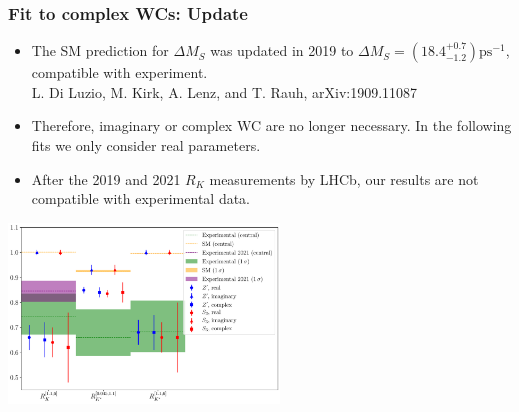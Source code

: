 \documentclass[mathserif, 10pt, dvipsnames]{beamer}
\newcommand\colorcite[1]{{\scriptsize\color{unizarblue}#1}}
\begin{document}
\begin{frame}\frametitle{Fit to complex WCs: Update}
    \begin{itemize}
\item The SM prediction for $\Delta M_S$ was updated in 2019 to $\Delta M_S = (18.4^{+0.7}_{-1.2}) \mathrm{ps}^{-1}$, compatible with experiment.\\ \colorcite{L. Di Luzio, M. Kirk, A. Lenz, and T. Rauh, arXiv:1909.11087}
        \item Therefore, imaginary or complex WC are no longer necessary. In the following fits we only consider real parameters.
        \item After the 2019 and 2021 $R_K$ measurements by LHCb, our results are not compatible with experimental data.
    \end{itemize}

    \begin{center}
\includegraphics[width=0.54\textwidth]{figures/errorplot_RK2021.pdf}
    \end{center}

\end{frame}
\end{document}
